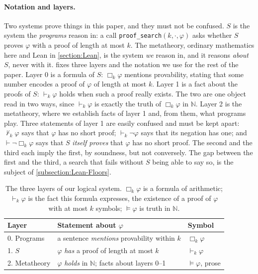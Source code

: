 \documentclass[twoside,11pt]{article}
\begin{document}
\paragraph{Notation and layers.} Two systems prove things in this paper, and they must not be confused. $S$ is the system the \emph{programs} reason in: a call \texttt{proof\_search}$(k,\cdot,\varphi)$ asks whether $S$ proves $\varphi$ with a proof of length at most $k$. The metatheory, ordinary mathematics here and Lean in \cref{section:Lean}, is the system \emph{we} reason in, and it reasons \emph{about} $S$, never with it.  fixes three layers and the notation we use for the rest of the paper. Layer 0 is a formula of $S$: $\Box_k\varphi$ mentions provability, stating that some number encodes a proof of $\varphi$ of length at most $k$. Layer 1 is a fact about the proofs of $S$: $\vdash_k\varphi$ holds when such a proof really exists. The two are one object read in two ways, since $\vdash_k\varphi$ is exactly the truth of $\Box_k\varphi$ in $\mathbb{N}$. Layer 2 is the metatheory, where we establish facts of layer 1 and, from them, what programs play. Three statements of layer 1 are easily confused and must be kept apart: $\nvdash_k \varphi$ says that $\varphi$ has no short proof; $\vdash_k \neg\varphi$ says that its negation has one; and $\vdash \neg\Box_k\varphi$ says that $S$ \emph{itself proves} that $\varphi$ has no short proof. The second and the third each imply the first, by soundness, but not conversely. The gap between the first and the third, a search that fails without $S$ being able to say so, is the subject of \cref{subsection:Lean-Floors}.


\begin{table}[h]\centering\small
\begin{tabular}{lll}\toprule
Layer & Statement about $\varphi$ & Symbol \\\midrule
0. Programs & a sentence \emph{mentions} provability within $k$ & $\Box_k\varphi$ \\
1. $S$ & $\varphi$ \emph{has} a proof of length at most $k$ & $\vdash_k\varphi$ \\
2. Metatheory & $\varphi$ \emph{holds} in $\mathbb{N}$; facts about layers 0--1 & $\models\varphi$, prose \\\bottomrule
\end{tabular}
\caption{The three layers of our logical system. $\Box_k\varphi$ is a formula of arithmetic; $\vdash_k\varphi$ is the fact this formula expresses, the existence of a proof of $\varphi$ with at most $k$ symbols; $\models\varphi$ is truth in $\mathbb{N}$.}
\label{table:Proof-layers}
\end{table}
\end{document}
